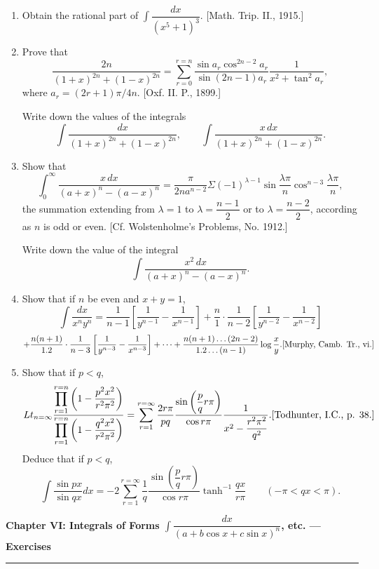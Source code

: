 \documentclass[11pt, a4paper]{article}
\newcommand{\source}[1]{\hfill\textnormal{[#1]}}
\begin{document}
\begin{enumerate}[leftmargin=2em]
\item Obtain the rational part of $\displaystyle\int \dfrac{dx}{(x^5+1)^3}$. \source{Math. Trip. II., 1915.}

\item Prove that
\[
\dfrac{2n}{(1+x)^{2n}+(1-x)^{2n}} = \sum_{r=0}^{r=n}\dfrac{\sin a_r\cos^{2n-2}a_r}{\sin(2n-1)a_r}\dfrac{1}{x^2+\tan^2a_r},
\]
where $a_r=(2r+1)\pi/4n$. \source{Oxf. II. P., 1899.}

Write down the values of the integrals
\[
\int \dfrac{dx}{(1+x)^{2n}+(1-x)^{2n}}, \qquad \int \dfrac{x\,dx}{(1+x)^{2n}+(1-x)^{2n}}.
\]

\item Show that
\[
\int_0^\infty \dfrac{x\,dx}{(a+x)^n-(a-x)^n} = \dfrac{\pi}{2na^{n-2}}\Sigma(-1)^{\lambda-1}\sin\dfrac{\lambda\pi}{n}\cos^{n-3}\dfrac{\lambda\pi}{n},
\]
the summation extending from $\lambda=1$ to $\lambda=\dfrac{n-1}{2}$ or to $\lambda=\dfrac{n-2}{2}$, according as $n$ is odd or even. \source{Cf. Wolstenholme's Problems, No. 1912.}

Write down the value of the integral
\[
\int \dfrac{x^2\,dx}{(a+x)^n-(a-x)^n}.
\]

\item Show that if $n$ be even and $x+y=1$,
\[
\int \dfrac{dx}{x^ny^n} = \dfrac{1}{n-1}\left[\dfrac{1}{y^{n-1}}-\dfrac{1}{x^{n-1}}\right]+\dfrac{n}{1}\cdot\dfrac{1}{n-2}\left[\dfrac{1}{y^{n-2}}-\dfrac{1}{x^{n-2}}\right]
\]
\[
+\dfrac{n(n+1)}{1.2}\cdot\dfrac{1}{n-3}\left[\dfrac{1}{y^{n-3}}-\dfrac{1}{x^{n-3}}\right]+\dots+\dfrac{n(n+1)\dots(2n-2)}{1.2\dots(n-1)}\log\dfrac{x}{y}. \source{Murphy, Camb. Tr., vi.}
\]

\item Show that if $p<q$,
\[
Lt_{n=\infty}\dfrac{\displaystyle\prod_{r=1}^{r=n}\left(1-\dfrac{p^2x^2}{r^2\pi^2}\right)}{\displaystyle\prod_{r=1}^{r=n}\left(1-\dfrac{q^2x^2}{r^2\pi^2}\right)} = \sum_{r=1}^{r=\infty}\dfrac{2r\pi}{pq}\dfrac{\sin\left(\dfrac{p}{q}r\pi\right)}{\cos r\pi}\dfrac{1}{x^2-\dfrac{r^2\pi^2}{q^2}}. \source{Todhunter, I.C., p. 38.}
\]
Deduce that if $p<q$,
\[
\int \dfrac{\sin px}{\sin qx}dx = -2\sum_{r=1}^{r=\infty}\dfrac1q\dfrac{\sin\left(\dfrac{p}{q}r\pi\right)}{\cos r\pi}\tanh^{-1}\dfrac{qx}{r\pi} \qquad (-\pi<qx<\pi).
\]

\end{enumerate}

\newpage

\begin{center}
    {\LARGE \bfseries \color{accent} Chapter VI: Integrals of Forms $\displaystyle\int \dfrac{dx}{(a+b\cos x+c\sin x)^n}$, etc. --- Exercises}\\
    \vspace{0.2cm}
    {\color{accent}\rule{0.55\linewidth}{0.8pt}}
\end{center}
\vspace{0.35cm}
\end{document}
